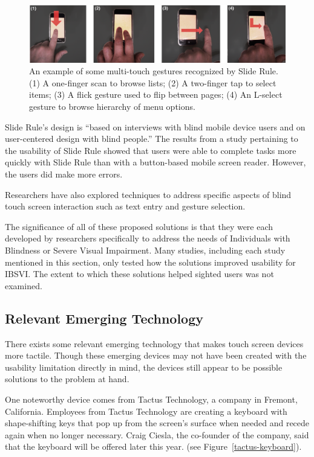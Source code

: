 \documentclass[11pt]{article}
\begin{document}
\begin{figure}[ht]
\centering
\includegraphics[width=4.5in]{slide-rule.jpg} 
\caption{An example of some multi-touch gestures recognized by Slide Rule.(1) A one-finger scan to browse lists; (2) A two-finger tap to select items; (3) A flick gesture used to flip between pages; (4) An L-select gesture to browse hierarchy of menu options. \cite{Kane:2008:SRM:1414471.1414487} }
\label{slide-rule}
\end{figure}

Slide Rule's design is ``based on interviews with blind mobile device users and on user-centered design with blind people.'' \cite{Kane:2008:SRM:1414471.1414487} The results from a study pertaining to the usability of Slide Rule showed that users were able to complete tasks more quickly with Slide Rule than with a button-based mobile screen reader. However, the users did make more errors. \cite{Kane:2008:SRM:1414471.1414487} 

Researchers have also explored techniques to address specific aspects of blind touch screen interaction such as text entry\cite{Tinwala:2010:ETE:1868914.1868972, Bonner:2010:NNA:2166616.2166649} and gesture selection.\cite{Kane:2011:UGB:1978942.1979001}

The significance of all of these proposed solutions is that they were each developed by researchers specifically to address the needs of Individuals with Blindness or Severe Visual Impairment. Many studies, including each study mentioned in this section, only tested how the solutions improved usability for IBSVI. The extent to which these solutions helped sighted users was not examined.
  

\subsection{Relevant Emerging Technology}
There exists some relevant emerging technology that makes touch screen devices more tactile. Though these emerging devices may not have been created with the usability limitation directly in mind, the devices still appear to be possible solutions to the problem at hand.

One noteworthy device comes from Tactus Technology, a company in Fremont, California. Employees from Tactus Technology are creating a keyboard with shape-shifting keys that pop up from the screen's surface when needed and recede again when no longer necessary.\cite{Tactus} Craig Ciesla, the co-founder of the company, said that the keyboard will be offered later this year. (see Figure~\ref{tactus-keyboard}).
\end{document}
